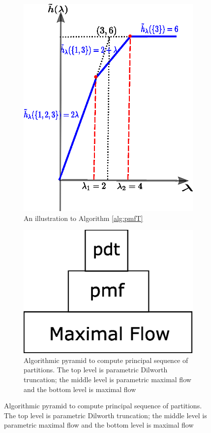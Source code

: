 \documentclass{article}
\begin{document}
\begin{figure}
	\centering
	\begin{subfigure}{0.45\textwidth}
		\includegraphics[width=\textwidth]{pic/example_pst_single.eps}
		\caption{An illustration to Algorithm \ref{alg:pmfT}}\label{fig:linseg}
	\end{subfigure}
	\begin{subfigure}{0.45\textwidth}
		\includegraphics[width=\textwidth]{pic/pdt.eps}
		\caption{Algorithmic pyramid to compute principal sequence of partitions. The top level is parametric Dilworth truncation; the middle level is parametric maximal flow and the bottom level is maximal flow}\label{fig:pyramid}
	\end{subfigure}
\end{figure}
\end{document}
